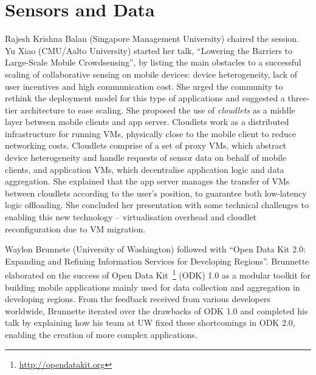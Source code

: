\section{Sensors and Data}
\label{sec:sensors}

Rajesh Krishna Balan (Singapore Management University) chaired the
session. Yu Xiao (CMU/Aalto University) started her talk, ``Lowering the
Barriers to Large-Scale Mobile Crowdsensing'', by listing the main
obstacles to a successful scaling of collaborative sensing on mobile devices:
device heterogeneity, lack of user incentives and high communication
cost. She urged the community to rethink the deployment model for this
type of applications and suggested a three-tier architecture to ease
scaling. She proposed the use of \emph{cloudlets} as a middle layer between
mobile clients and app server. Cloudlets work as a
distributed infrastructure for running VMs, physically close to the
mobile client to reduce networking costs. Cloudlets comprise of a set of
proxy VMs, which abstract device heterogeneity and handle requests of
sensor data on behalf of mobile clients, and application VMs, which
decentralise application logic and data aggregation. She explained that
the app server manages the transfer of VMs between cloudlets according
to the user's position, to guarantee both low-latency logic
offloading. She concluded her presentation with some technical
challenges to enabling this new technology -- virtualisation overhead and
cloudlet reconfiguration due to VM migration.

Waylon Brunnete (University of Washington) followed with ``Open Data Kit
2.0: Expanding and Refining Information Services for Developing
Regions''. Brunnette elaborated on the success of Open Data
Kit~\footnote{\url{http://opendatakit.org}} (ODK) 1.0 as a modular
toolkit for building mobile applications mainly used for data collection
and aggregation in developing regions. From the feedback received from
various developers worldwide, Brunnette iterated over the drawbacks of
ODK 1.0 and completed his talk by explaining how his team at UW fixed
these shortcomings in ODK 2.0, enabling the creation of more complex
applications.


